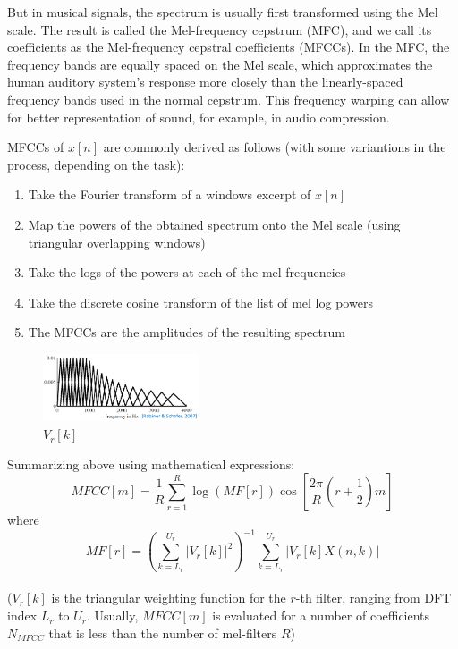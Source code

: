 \documentclass{article}
\theoremstyle{plain}
\theoremstyle{definition}
\theoremstyle{remark}
\begin{document}
	But in musical signals, the spectrum is usually first transformed using the Mel scale. The result is called the Mel-frequency cepstrum (MFC), and we call its coefficients as the Mel-frequency cepstral coefficients (MFCCs).
	In the MFC, the frequency bands are equally spaced on the Mel scale, which approximates the human auditory system's response more closely than the linearly-spaced frequency bands used in the normal cepstrum. This frequency warping can allow for better representation of sound, for example, in audio compression.
	
	MFCCs of $x[n]$ are commonly derived as follows (with some variantions in the process, depending on the task):
	\begin{enumerate}
		\item Take the Fourier transform of a windows excerpt of $x[n]$
		\item Map the powers of the obtained spectrum onto the Mel scale (using triangular overlapping windows)
		
		\item Take the logs of the powers at each of the mel frequencies
		
		\item Take the discrete cosine transform of the list of mel log powers
		
		\item The MFCCs are the amplitudes of the resulting spectrum
	\end{enumerate}


\begin{figure}
  \begin{center}
    \includegraphics[height=2cm]{fig3.png}
  \end{center}
    \caption{$V_r[k]$}
\end{figure}

	Summarizing above using mathematical expressions:
	$$MFCC[m] = \frac{1}{R} \sum_{r = 1}^R \log (MF[r]) \cos \left[ \frac{2\pi}{R} \left(r + \frac{1}{2}\right)m \right]$$
	where
	$$MF[r] = \left( \sum_{k = L_r}^{U_r} \left| V_r[k] \right|^2 \right)^{-1} \sum_{k = L_r}^{U_r} \left| V_r[k] X(n, k) \right|$$
	\\
	($V_r[k]$ is the triangular weighting function for the $r$-th filter, ranging from DFT index $L_r$ to $U_r$. Usually, $MFCC[m]$ is evaluated for a number of coefficients $N_{MFCC}$ that is less than the number of mel-filters $R$)
\end{document}

